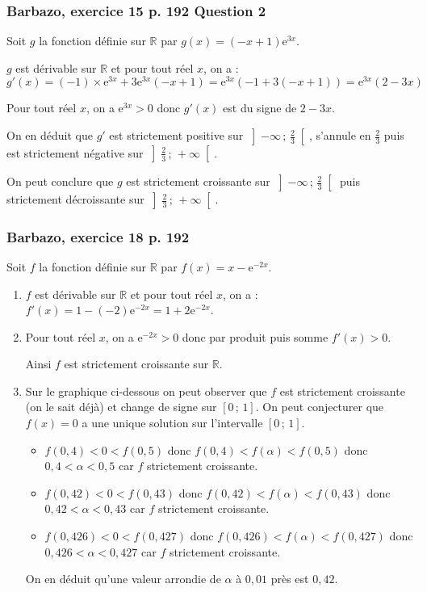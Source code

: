 \documentclass[11pt, hyperref={urlcolor=red,%
            linkcolor=blue, %
            colorlinks=true}]{beamer}
\newcommand{\R}{\mathbb{R}}
\newcommand{\Interoo}[2]{\left]#1\, ;\, #2\right[}
\newcommand{\Interff}[2]{\left[#1\, ;\, #2\right]}
\begin{document}
\begin{frame}
\frametitle{Barbazo, exercice 15 p. 192 Question 2}
\label{exo15}

Soit $g$ la fonction définie sur $\R$ par $g(x)=(-x+1)\text{e}^{3x}$.

$g$ est dérivable sur $\R$ et pour tout réel $x$, on a :
\begin{equation*}
g'(x)=(-1)\times \text{e}^{3x} + 3 \text{e}^{3x}(-x+1)=\text{e}^{3x} (-1+3(-x+1))=\text{e}^{3x} (2-3x)
\end{equation*}


Pour tout réel $x$, on a $\text{e}^{3x}>0$ donc $g'(x)$ est du signe de $2-3x$.

On en déduit que $g'$ est strictement  positive sur $\Interoo{-\infty}{\frac{2}{3}}$, s'annule en $\frac{2}{3}$ puis est strictement négative sur $\Interoo{\frac{2}{3}}{+\infty}$.

On peut conclure que $g$ est strictement  croissante sur $\Interoo{-\infty}{\frac{2}{3}}$ puis  strictement décroissante sur $\Interoo{\frac{2}{3}}{+\infty}$.
\end{frame}




\begin{frame}
\frametitle{Barbazo, exercice 18 p. 192}
\label{exo18}

Soit $f$ la fonction définie sur $\R$ par $f(x)=x-\text{e}^{-2x}$.

\begin{enumerate}
	\item $f$ est dérivable sur $\R$ et pour tout réel $x$, on a :$f'(x)=1-(-2)\text{e}^{-2x}= 1+2\text{e}^{-2x}$.
	\item Pour tout réel $x$, on a $\text{e}^{-2x}>0$ donc par produit puis somme $f'(x)>0$.
	
	Ainsi $f$ est strictement croissante sur $\R$.
	\item Sur le graphique ci-dessous on peut observer que $f$ est strictement croissante (on le sait déjà) et change de signe sur $\Interff{0}{1}$. On peut conjecturer que $f(x)=0$ a une unique solution sur l'intervalle $\Interff{0}{1}$.
	\begin{itemize}
		\item $f(0,4)<0<f(0,5)$ donc $f(0,4)<f(\alpha)<f(0,5)$ donc  $0,4<\alpha<0,5$ car $f$ strictement croissante. 
			\item $f(0,42)<0<f(0,43)$ donc $f(0,42)<f(\alpha)<f(0,43)$ donc  $0,42<\alpha<0,43$ car $f$ strictement croissante. 
						\item $f(0,426)<0<f(0,427)$ donc $f(0,426)<f(\alpha)<f(0,427)$ donc  $0,426<\alpha<0,427$ car $f$ strictement croissante. 
	\end{itemize}
	
On en déduit qu'une valeur arrondie de $\alpha$ à $0,01$ près est $0,42$.
	
\end{enumerate}

\end{frame}
\end{document}
